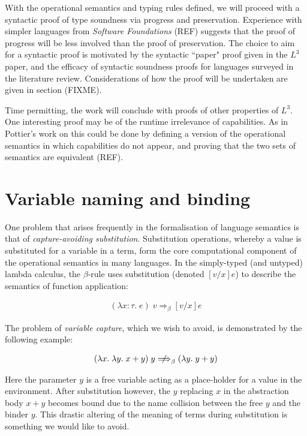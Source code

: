 \documentclass[]{unswthesis}
\newcommand{\SSPHS}{\text{SSPHS }}
\begin{document}
With the operational semantics and typing rules defined, we will proceed with a syntactic proof of type soundness via progress and preservation. Experience with simpler languages from \textit{Software Foundations} (REF) suggests that the proof of progress will be less involved than the proof of preservation. The choice to aim for a syntactic proof is motivated by the syntactic ``paper" proof given in the $L^3$ paper, and the efficacy of syntactic soundness proofs for languages surveyed in the literature review. Considerations of how the proof will be undertaken are given in section (FIXME).

Time permitting, the work will conclude with proofs of other properties of $L^3$. One interesting proof may be of the runtime irrelevance of capabilities. As in Pottier's work on \SSPHS this could be done by defining a version of the operational semantics in which capabilities do not appear, and proving that the two sets of semantics are equivalent (REF).

\section{Variable naming and binding}
\label{sec:var_naming}

One problem that arises frequently in the formalisation of language semantics is that of \textit{capture-avoiding substitution}. Substitution operations, whereby a value is substituted for a variable in a term, form the core computational component of the operational semantics in many languages. In the simply-typed (and untyped) lambda calculus, the $\beta$-rule uses substitution (denoted $[v/x]e$) to describe the semantics of function application:

\begin{eqnarray*}
(\lambda x : \tau. \; e) \; v \Longrightarrow_\beta [v/x]e
\end{eqnarray*}

The problem of \textit{variable capture}, which we wish to avoid, is demonstrated by the following example:

\begin{eqnarray*}
(\lambda x. \; \lambda y. \; x + y) \; y \; {\centernot\Longrightarrow}_\beta \; (\lambda y. \; y + y)
\end{eqnarray*}

Here the parameter $y$ is a free variable acting as a place-holder for a value in the environment. After substitution however, the $y$ replacing $x$ in the abstraction body $x + y$ becomes bound due to the name collision between the free $y$ and the binder $y$. This drastic altering of the meaning of terms during substitution is something we would like to avoid.
\end{document}
